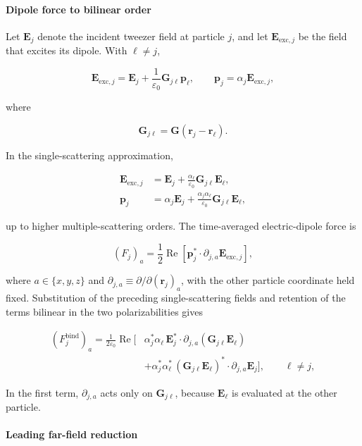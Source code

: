 \paragraph*{Dipole force to bilinear order}

Let \(\mathbf E_j\) denote the incident tweezer field at particle \(j\), and
let \(\mathbf E_{\mathrm{exc},j}\) be the field that excites its dipole.  With
\(\ell\ne j\),

\[
\mathbf E_{\mathrm{exc},j}
=\mathbf E_j+\frac{1}{\varepsilon_0}\mathbf G_{j\ell}\mathbf p_\ell,
\qquad
\mathbf p_j=\alpha_j\mathbf E_{\mathrm{exc},j},
\]

where

\[
\mathbf G_{j\ell}=\mathbf G(\mathbf r_j-\mathbf r_\ell).
\]

In the single-scattering approximation,

\[
\begin{aligned}
\mathbf E_{\mathrm{exc},j}
&=\mathbf E_j+
\frac{\alpha_\ell}{\varepsilon_0}\mathbf G_{j\ell}\mathbf E_\ell,\\
\mathbf p_j
&=\alpha_j\mathbf E_j+
\frac{\alpha_j\alpha_\ell}{\varepsilon_0}
\mathbf G_{j\ell}\mathbf E_\ell,
\end{aligned}
\]

up to higher multiple-scattering orders.  The time-averaged electric-dipole
force is

\[
(F_j)_a=\frac12\operatorname{Re}\!\left[
\mathbf p_j^*\cdot\partial_{j,a}\mathbf E_{\mathrm{exc},j}
\right],
\]

where \(a\in\{x,y,z\}\) and
\(\partial_{j,a}\equiv\partial/\partial(\mathbf r_j)_a\), with the other
particle coordinate held fixed.  Substitution of the preceding
single-scattering fields and retention of the terms bilinear in the two
polarizabilities gives

\[
\begin{aligned}
(F_j^{\mathrm{bind}})_a
=\frac{1}{2\varepsilon_0}\operatorname{Re}\!\Big[{}
&\alpha_j^*\alpha_\ell\,
\mathbf E_j^* \cdot
\partial_{j,a}\!\left(\mathbf G_{j\ell}\mathbf E_\ell\right)\\
&+\alpha_j^*\alpha_\ell^*\,
(\mathbf G_{j\ell}\mathbf E_\ell)^* \cdot
\partial_{j,a}\mathbf E_j
\Big],
\qquad \ell\neq j,
\end{aligned}
\]

In the first term, \(\partial_{j,a}\) acts only on
\(\mathbf G_{j\ell}\), because \(\mathbf E_\ell\) is evaluated at the other
particle.

\paragraph*{Leading far-field reduction}

